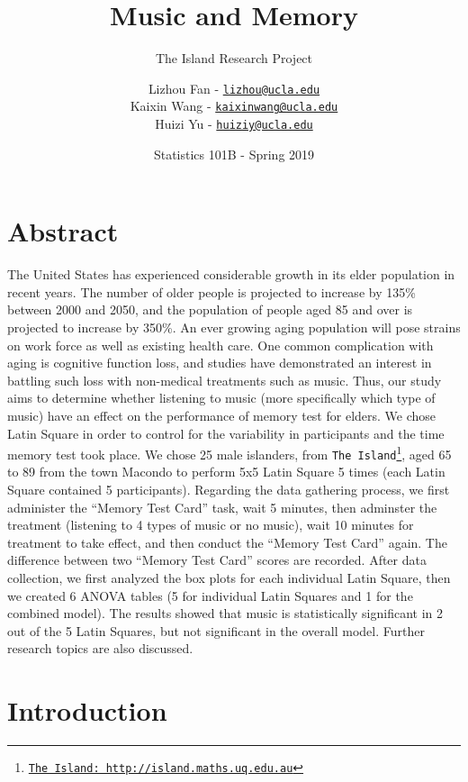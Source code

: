 \documentclass[]{article}
\title{Music and Memory}
\subtitle{The Island Research Project}
\author{Lizhou Fan - \href{mailto:lizhou@ucla.edu}{\nolinkurl{lizhou@ucla.edu}} \\ Kaixin Wang -
\href{mailto:kaixinwang@ucla.edu}{\nolinkurl{kaixinwang@ucla.edu}} \\ Huizi Yu - \href{mailto:huiziy@ucla.edu}{\nolinkurl{huiziy@ucla.edu}}}
\date{Statistics 101B - Spring 2019}
\let\rmarkdownfootnote\footnote%
\def\footnote{\protect\rmarkdownfootnote}
\begin{document}
\maketitle

\begin{singlespace}
\tableofcontents
\end{singlespace}\newpage

\section{Abstract}\label{abstract}

The United States has experienced considerable growth in its elder
population in recent years. The number of older people is projected to
increase by 135\% between 2000 and 2050, and the population of people
aged 85 and over is projected to increase by 350\%. An ever growing
aging population will pose strains on work force as well as existing
health care. One common complication with aging is cognitive function
loss, and studies have demonstrated an interest in battling such loss
with non-medical treatments such as music. Thus, our study aims to
determine whether listening to music (more specifically which type of
music) have an effect on the performance of memory test for elders. We
chose Latin Square in order to control for the variability in
participants and the time memory test took place. We chose 25 male
islanders, from \texttt{The\ Island}\footnote{\href{http://island.maths.uq.edu.au}{\texttt{The\ Island:\ http://island.maths.uq.edu.au}}},
aged 65 to 89 from the town Macondo to perform 5x5 Latin Square 5 times
(each Latin Square contained 5 participants). Regarding the data
gathering process, we first administer the ``Memory Test Card'' task,
wait 5 minutes, then adminster the treatment (listening to 4 types of
music or no music), wait 10 minutes for treatment to take effect, and
then conduct the ``Memory Test Card'' again. The difference between two
``Memory Test Card'' scores are recorded. After data collection, we
first analyzed the box plots for each individual Latin Square, then we
created 6 ANOVA tables (5 for individual Latin Squares and 1 for the
combined model). The results showed that music is statistically
significant in 2 out of the 5 Latin Squares, but not significant in the
overall model. Further research topics are also discussed.

\section{Introduction}\label{introduction}
\end{document}
